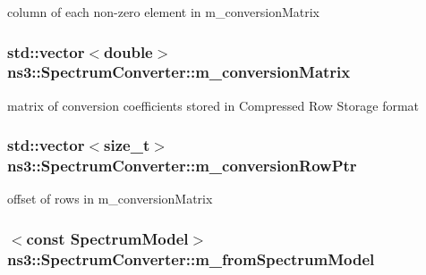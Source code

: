 column of each non-\/zero element in m\+\_\+conversion\+Matrix 

\subsubsection[{\texorpdfstring{m\+\_\+conversion\+Matrix}{m_conversionMatrix}}]{\setlength{\rightskip}{0pt plus 5cm}std\+::vector$<$double$>$ ns3\+::\+Spectrum\+Converter\+::m\+\_\+conversion\+Matrix\hspace{0.3cm}{\ttfamily [private]}}\hypertarget{classns3_1_1SpectrumConverter_a099d906c2994643e9e37b4eeea96f8e8}{}\label{classns3_1_1SpectrumConverter_a099d906c2994643e9e37b4eeea96f8e8}


matrix of conversion coefficients stored in Compressed Row Storage format 

\subsubsection[{\texorpdfstring{m\+\_\+conversion\+Row\+Ptr}{m_conversionRowPtr}}]{\setlength{\rightskip}{0pt plus 5cm}std\+::vector$<$size\+\_\+t$>$ ns3\+::\+Spectrum\+Converter\+::m\+\_\+conversion\+Row\+Ptr\hspace{0.3cm}{\ttfamily [private]}}\hypertarget{classns3_1_1SpectrumConverter_ae0fa415f07184df143b9ecfb826eb345}{}\label{classns3_1_1SpectrumConverter_ae0fa415f07184df143b9ecfb826eb345}


offset of rows in m\+\_\+conversion\+Matrix 

\subsubsection[{\texorpdfstring{m\+\_\+from\+Spectrum\+Model}{m_fromSpectrumModel}}]{$<$const {\bf Spectrum\+Model}$>$ ns3\+::\+Spectrum\+Converter\+::m\+\_\+from\+Spectrum\+Model\hspace{0.3cm}{\ttfamily [private]}}\hypertarget{classns3_1_1SpectrumConverter_a152eb969ac726014de6563397bee9fc7}{}\label{classns3_1_1SpectrumConverter_a152eb969ac726014de6563397bee9fc7}


